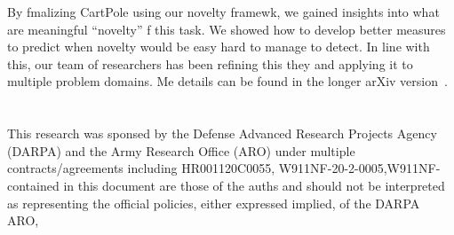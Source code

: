 \documentclass[letterpaper]{article} %
\begin{document}
By fmalizing CartPole using our novelty framewk, we gained insights into what are meaningful ``novelty'' f this task.
We showed how to develop better measures to predict when novelty would be easy  hard to manage  to detect.
In line with this, our team of researchers has been refining this they and applying it to multiple problem domains.
Me details can be found in the longer arXiv version~\cite{Boult-eta-al-novelty20}.

{\footnotesize
\section*{}
This research was  sponsed  by the Defense Advanced Research Projects Agency (DARPA) and the Army Research Office (ARO) under multiple contracts/agreements including  HR001120C0055, W911NF-20-2-0005,W911NF- contained in this document are those of the auths and should not be interpreted as representing the official policies, either expressed  implied, of the DARPA  ARO,  
}



{\small
\clearpage

}
\end{document}

